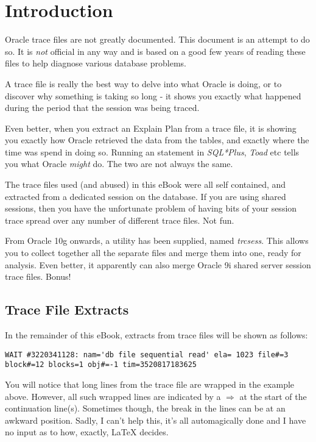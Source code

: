 \chapter{Introduction}\label{introduction}

Oracle trace files are not greatly documented. This document is an attempt to do so. It is \emph{not} official in any way and is based on a good few years of reading these files to help diagnose various database problems.

A trace file is really the best way to delve into what Oracle is doing, or to discover why something is taking so long - it shows you exactly what happened during the period that the session was being traced.

Even better, when you extract an Explain Plan from a trace file, it is showing you exactly how Oracle retrieved the data from the tables, and exactly where the time was spend in doing so. Running an  statement in \emph{SQL*Plus}, \emph{Toad} etc tells you what Oracle \emph{might} do. The two are not always the same.

The trace files used (and abused) in this eBook were all self contained, and extracted from a dedicated session on the database. If you are using shared sessions, then you have the unfortunate problem of having bits of your session trace spread over any number of different trace files. Not fun.

From Oracle 10g onwards, a utility has been supplied, named \emph{trcsess}. This allows you to collect together all the separate files and merge them into one, ready for analysis. Even better, it apparently can also merge Oracle 9i shared server session trace files. Bonus!

\section*{Trace File Extracts}

In the remainder of this eBook, extracts from trace files will be shown as follows:

\begin{lstlisting}[numbers=none]
WAIT #3220341128: nam='db file sequential read' ela= 1023 file#=3 block#=12 blocks=1 obj#=-1 tim=3520817183625
\end{lstlisting}

You will notice that long lines from the trace file are wrapped in the example above. However, all such wrapped lines are indicated by a \textbf{$\Longrightarrow$} at the start of the continuation line(s). Sometimes though, the break in the lines can be at an awkward position. Sadly, I can't help this, it's all automagically done and I have no input as to how, exactly, \LaTeX{} decides.


